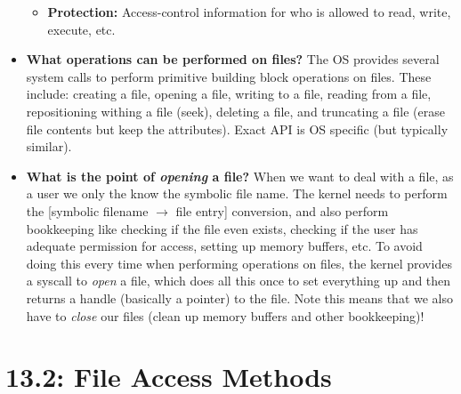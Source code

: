 \documentclass[12pt]{article}
\begin{document}
\begin{itemize}
\begin{itemize}
            \item \textbf{Protection:} Access-control information for who is allowed to read, write, execute, etc.
        \end{itemize}
    \item \textbf{What operations can be performed on files?} The OS provides several system calls to perform primitive building block operations on files. These include: creating a file, opening a file, writing to a file, reading from a file, repositioning withing a file (seek), deleting a file, and truncating a file (erase file contents but keep the attributes). Exact API is OS specific (but typically similar).
    \item \textbf{What is the point of \textit{opening} a file?} When we want to deal with a file, as a user we only the know the symbolic file name. The kernel needs to perform the [symbolic filename \(\rightarrow\) file entry] conversion, and also perform bookkeeping like checking if the file even exists, checking if the user has adequate permission for access, setting up memory buffers, etc. To avoid doing this every time when performing operations on files, the kernel provides a syscall to \textit{open} a file, which does all this once to set everything up and then returns a handle (basically a pointer) to the file. Note this means that we also have to \textit{close} our files (clean up memory buffers and other bookkeeping)!
\end{itemize}

\section*{13.2: File Access Methods}
\end{document}
